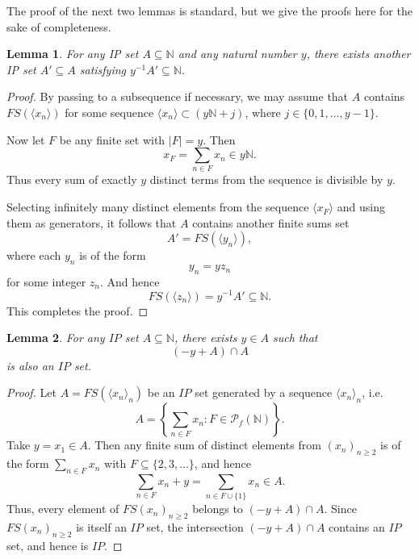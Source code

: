 \documentclass{aic}
\newtheorem{lem}{Lemma}
\newcommand{\N}{\mathbb{N}}
\begin{document}
The proof of the next two lemmas is standard, but we give the proofs here for the sake of completeness.

\begin{lem}\label{2}
For any IP set \( A \subseteq \mathbb{N} \) and any natural number \( y \), there exists another IP set \( A' \subseteq A \) satisfying \( y^{-1}A' \subseteq \mathbb{N} \).
\end{lem}

\begin{proof}
By passing to a subsequence if necessary, we may assume that 
\(A\) contains \(FS(\langle x_n \rangle)\) for some sequence 
\(\langle x_n \rangle \subset (y\mathbb{N}+j)\), where 
\(j \in \{0,1,\ldots ,y-1\}\).

Now let \(F\) be any finite set with \(|F|=y\). Then
\[
x_F=\sum_{n\in F} x_n \in y\mathbb{N}.
\]
Thus every sum of exactly \(y\) distinct terms from the sequence 
is divisible by \(y\).

Selecting infinitely many distinct elements from the sequence 
\(\langle x_F\rangle\) and using them as generators, it follows that 
\(A\) contains another finite sums set
\[
A' = FS(\langle y_n\rangle),
\]
where each \(y_n\) is of the form
\[
y_n = y z_n
\]
for some integer \(z_n\). And hence $$FS(\langle z_n\rangle)= y^{-1}A'\subseteq \mathbb{N}.$$ This completes the proof.
\end{proof}


\begin{lem}\label{3}
For any \( IP \) set \( A \subseteq \mathbb{N} \), there exists \( y \in A \) such that 
\[
(-y + A) \cap A
\]
is also an \( IP \) set.
\end{lem}

\begin{proof}
Let \( A = FS(\langle x_n \rangle_n) \) be an \( IP \) set generated by a sequence \( \langle x_n \rangle_n \), i.e. 
\[
A = \left\{ \sum_{n \in F} x_n :  F \in \mathcal{P}_f(\N) \right\}.
\]
Take \( y = x_1 \in A \). Then any finite sum of distinct elements from \( (x_{n})_{n \ge 2} \) is of the form \( \sum_{n \in F} x_n \) with \( F \subseteq \{2,3,\dots\} \), and hence 
\[
\sum_{n \in F} x_n + y = \sum_{n \in F \cup \{1\}} x_n \in A.
\]
Thus, every element of \( FS(x_{n})_{n \ge 2} \) belongs to \( (-y + A) \cap A \). Since \( FS(x_{n})_{n \ge 2} \) is itself an \( IP \) set, the intersection \( (-y + A) \cap A \) contains an \( IP \) set, and hence is \( IP \).
\end{proof}
\end{document}
